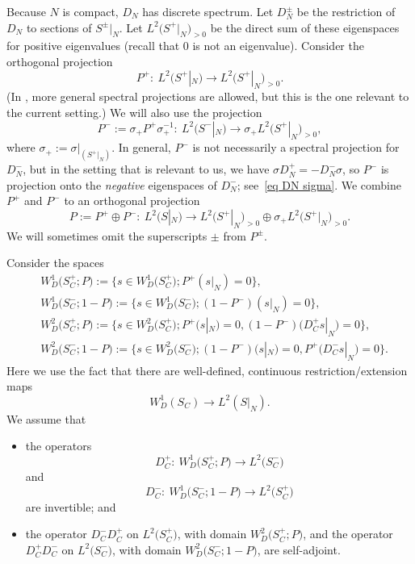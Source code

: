 \documentclass[10pt,a4paper]{amsart}
\numberwithin{equation}{section}
\begin{document}
Because $N$ is compact, $D_N$ has discrete spectrum.
Let $D_N^{\pm}$ be the restriction of $D_N$ to sections of $S^{\pm}|_N$.
 Let $L^2\big(S^+|_N\big)_{>0}$ be the direct sum of these eigenspaces for positive eigenvalues (recall that $0$ is not an eigenvalue).
 Consider the orthogonal projection
\begin{equation} \label{eq def P+}
P^+\colon\ L^2\big(S^+|_N\big) \to L^2\big(S^+|_N\big)_{>0}.
\end{equation}
(In \cite{HW21a}, more general spectral projections are allowed, but this is the one relevant to the current setting.)
We will also use the projection
\[
P^- := \sigma_+ P^+ \sigma_+^{-1} \colon\ L^2\big(S^-|_N\big) \to \sigma_+L^2\big(S^+|_N\big)_{>0},
\]
where $\sigma_+:= \sigma|_{(S^+|_N)}$.
In general, $P^-$ is not necessarily a spectral projection for $D_N^-$, but in the setting that is relevant to us, we have $\sigma D_N^+ = -D_N^- \sigma$, so $P^-$ is projection onto the \emph{negative} eigenspaces of $D_N^-$; see~\eqref{eq DN sigma}.
We combine $P^+$ and $P^-$ to an orthogonal projection
\begin{equation} \label{eq def P}
P := P^+ \oplus P^-\colon \ L^2(S|_N) \to L^2\big(S^+|_N\big)_{>0} \oplus
\sigma_+L^2\big(S^+|_N\big)_{>0}.
\end{equation}
We
 will sometimes omit the superscripts $\pm$ from $P^{\pm}$.

Consider the spaces
\begin{equation} \label{eq def WnD}
\begin{split}
&W^1_D\big(S_C^+; P\big):= \big\{s \in W^1_D\big(S_C^+\big); P^+(s|_N) = 0\big\},\\[1mm]
&W^1_D\big(S_C^-;1- P\big) := \big\{s \in W^1_D\big(S_C^-\big); (1-P^-)(s|_N) = 0\big\},\\[1mm]
&W^2_D\big(S_C^+; P\big) := \big\{s \in W^2_D\big(S_C^+\big); P^+(s|_N) = 0, (1-P^-)\big(D^+_Cs|_N\big) = 0\big\},\\[1mm]
&W^2_D\big(S_C^-; 1-P\big) := \big\{s \in W^2_D\big(S_C^-\big); (1-P^-)(s|_N) = 0, P^+\big(D^-_Cs|_N\big) = 0\big\}.
\end{split}
\end{equation}
Here we use the fact that there are well-defined, continuous restriction/extension maps
\[
{W^1_D(S_C) \to L^2(S|_N)}.
\]
We assume that
\begin{itemize}\itemsep=0pt
\item the operators
\begin{equation} \label{eq DC+}
D^+_C\colon\ W^1_D\big(S_C^+; P\big) \to L^2\big(S_C^-\big)
\end{equation}
and
\begin{equation} \label{eq DC-}
D^-_C\colon\ W^1_D\big(S_C^-; 1-P\big) \to L^2\big(S_C^+\big)
\end{equation}
are invertible; and
\item the operator $D^-_C D_C^+$ on $L^2\big(S_C^+\big)$, with domain $W^2_D\big(S_C^+; P\big)$, and the operator $D^+_C D_C^-$ on $L^2\big(S_C^-\big)$, with domain $W^2_D\big(S_C^-; 1-P\big)$, are self-adjoint.
\end{itemize}
\end{document}
